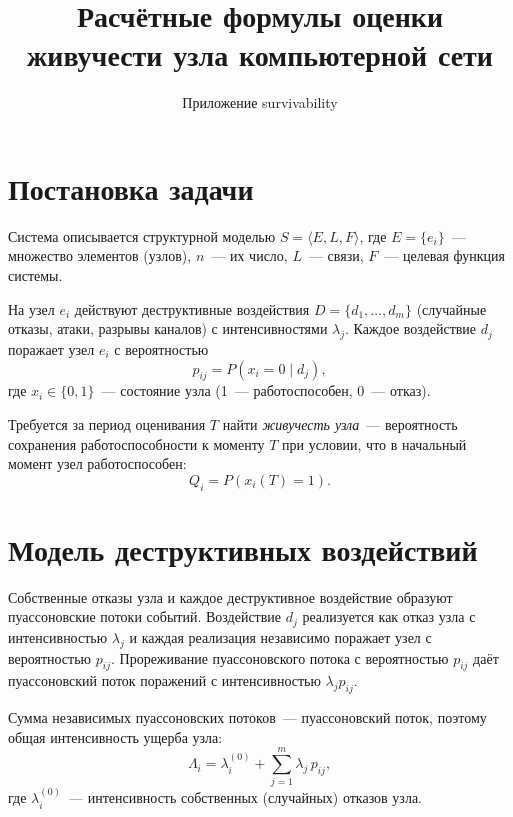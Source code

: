 \documentclass[12pt]{article}
\title{Расчётные формулы оценки живучести узла компьютерной сети}
\author{Приложение survivability}
\date{}
\begin{document}
\maketitle

\section{Постановка задачи}

Система описывается структурной моделью $S = \langle E, L, F \rangle$, где
$E = \{e_i\}$~--- множество элементов (узлов), $n$~--- их число,
$L$~--- связи, $F$~--- целевая функция системы.

На узел $e_i$ действуют деструктивные воздействия
$D = \{d_1, \dots, d_m\}$ (случайные отказы, атаки, разрывы каналов) с
интенсивностями $\lambda_j$. Каждое воздействие $d_j$ поражает узел $e_i$ с
вероятностью
\begin{equation}
p_{ij} = P\!\left(x_i = 0 \mid d_j\right),
\end{equation}
где $x_i \in \{0, 1\}$~--- состояние узла (1~--- работоспособен, 0~--- отказ).

Требуется за период оценивания $T$ найти \emph{живучесть узла}~--- вероятность
сохранения работоспособности к моменту $T$ при условии, что в начальный момент
узел работоспособен:
\begin{equation}
Q_i = P\!\left(x_i(T) = 1\right).
\end{equation}

\section{Модель деструктивных воздействий}

Собственные отказы узла и каждое деструктивное воздействие образуют
пуассоновские потоки событий. Воздействие $d_j$ реализуется как отказ узла с
интенсивностью $\lambda_j$ и каждая реализация независимо поражает узел с
вероятностью $p_{ij}$. Прореживание пуассоновского потока с вероятностью
$p_{ij}$ даёт пуассоновский поток поражений с интенсивностью $\lambda_j p_{ij}$.

Сумма независимых пуассоновских потоков~--- пуассоновский поток, поэтому
общая интенсивность ущерба узла:
\begin{equation}
\Lambda_i = \lambda_i^{(0)} + \sum_{j=1}^{m} \lambda_j \, p_{ij},
\label{eq:lambda}
\end{equation}
где $\lambda_i^{(0)}$~--- интенсивность собственных (случайных) отказов узла.
\end{document}
